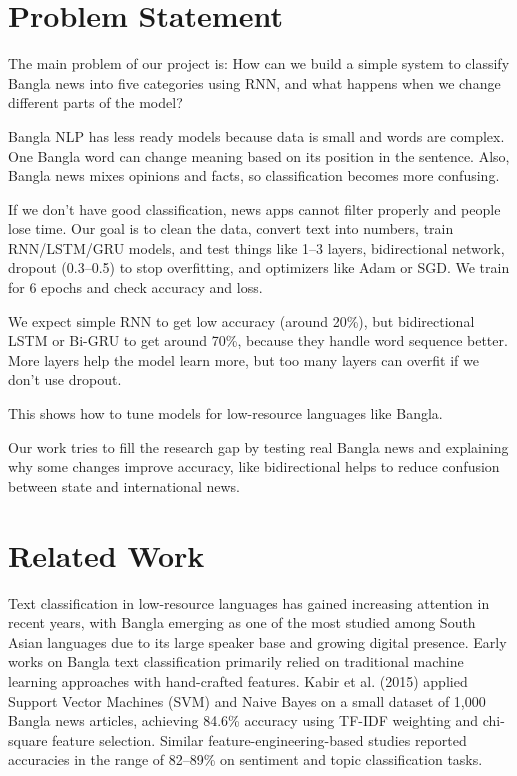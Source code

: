 \documentclass[pdflatex,sn-mathphys-num]{sn-jnl}
\theoremstyle{thmstyleone}\newtheorem{theorem}{Theorem}
\theoremstyle{thmstyletwo}\newtheorem{example}{Example}\newtheorem{remark}{Remark}
\theoremstyle{thmstylethree}\newtheorem{definition}{Definition}
\begin{document}
\section{Problem Statement}

The main problem of our project is: How can we build a simple system to classify Bangla news into five categories using RNN, and what happens when we change different parts of the model?

Bangla NLP has less ready models because data is small and words are complex. One Bangla word can change meaning based on its position in the sentence. Also, Bangla news mixes opinions and facts, so classification becomes more confusing.

If we don’t have good classification, news apps cannot filter properly and people lose time. Our goal is to clean the data, convert text into numbers, train RNN/LSTM/GRU models, and test things like 1--3 layers, bidirectional network, dropout (0.3--0.5) to stop overfitting, and optimizers like Adam or SGD. We train for 6 epochs and check accuracy and loss.

We expect simple RNN to get low accuracy (around 20\%), but bidirectional LSTM or Bi-GRU to get around 70\%, because they handle word sequence better. More layers help the model learn more, but too many layers can overfit if we don’t use dropout.

This shows how to tune models for low-resource languages like Bangla.

Our work tries to fill the research gap by testing real Bangla news and explaining why some changes improve accuracy, like bidirectional helps to reduce confusion between state and international news.

\section{Related Work}
\label{sec:related-work}

Text classification in low-resource languages has gained increasing attention in recent years, with Bangla emerging as one of the most studied among South Asian languages due to its large speaker base and growing digital presence. Early works on Bangla text classification primarily relied on traditional machine learning approaches with hand-crafted features. Kabir et al. (2015) \cite{kabir2015} applied Support Vector Machines (SVM) and Naive Bayes on a small dataset of 1,000 Bangla news articles, achieving 84.6\% accuracy using TF-IDF weighting and chi-square feature selection. Similar feature-engineering-based studies \cite{alam2016, islam2018} reported accuracies in the range of 82–89\% on sentiment and topic classification tasks.
\end{document}
